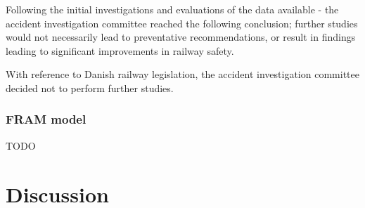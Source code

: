 Following the initial investigations and evaluations of the data available - the accident investigation committee reached the following conclusion; further studies would not necessarily lead to preventative recommendations, or result in findings leading to significant improvements in railway safety.

With reference to Danish railway legislation, the accident investigation committee decided not to perform further studies. 

\subsubsection{FRAM model}
TODO
\section{Discussion}
